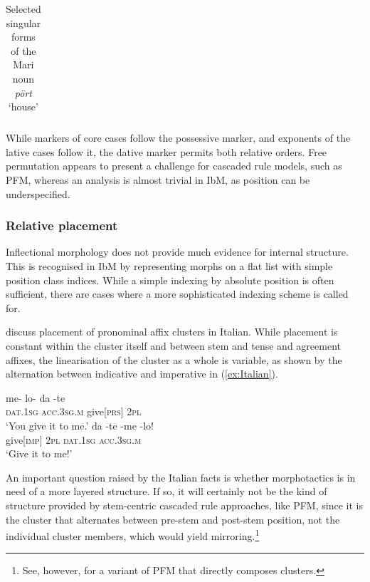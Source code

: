 \documentclass[output=paper
                ,modfonts
                ,nonflat
	        ,collection
	        ,collectionchapter
	        ,collectiontoclongg
 	        ,biblatex
                ,babelshorthands
                ,newtxmath
                ,draftmode
                ,colorlinks, citecolor=brown
] {langscibook}
\begin{document}
{\begin{table}[htb]
\begin{tabular}{llll}
    \bottomrule
  \end{tabular}
  
  \caption{Selected singular forms of the Mari noun \emph{pört} ‘house’}
  \label{tab:MariSingular}
\end{table}

While markers of core cases follow the possessive marker, and
exponents of the lative cases follow it, the dative marker permits
both relative orders. Free permutation appears to present a 
challenge for cascaded rule models, such as PFM, whereas an analysis is almost
trivial in IbM, as position can be underspecified. 

\subsubsection*{Relative placement}

Inflectional morphology does not provide much evidence for internal
structure. This is recognised in IbM by representing morphs on a flat
list with simple position class indices. While a simple indexing by
absolute position is often sufficient, there are cases where a more
sophisticated indexing scheme is called
for.

\citet{Crysmann:Bonami:2016} discuss placement of pronominal affix
clusters in Italian. While placement is constant within the
cluster itself and between stem and tense and agreement affixes, the
linearisation of the cluster as a whole is variable, as shown by the
alternation between indicative and imperative in (\ref{ex:Italian}). 

\begin{exe}
  \ex\label{ex:Italian}
  \begin{xlist}
    \ex\gll me- lo- da -te\\
    \textsc{dat.1sg} \textsc{acc.3sg.m} give[\textsc{prs}] \textsc{2pl}\\
    \glt ‘You give it to me.’
    \ex\gll da -te -me -lo!\\
    give[\textsc{imp}] \textsc{2pl} \textsc{dat.1sg} \textsc{acc.3sg.m}\\
    \glt ‘Give it to me!’
  \end{xlist}
\end{exe}


An important question raised by the Italian facts is whether
morphotactics is in need of a more layered structure. If so, it will
certainly not be the kind of structure provided by stem-centric
cascaded rule approaches, like PFM, since it is  the cluster that
alternates between pre-stem and post-stem position, not the individual
cluster members, which would yield mirroring.\footnote{See, however, \citet{Spencer05}
for a variant of PFM that directly composes clusters.} 

}
\end{document}
